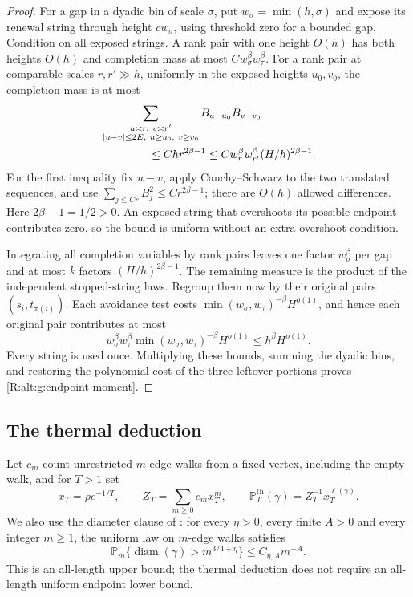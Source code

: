 \begin{proof}
For a gap in a dyadic bin of scale $\sigma$, put
$w_\sigma=\min(h,\sigma)$ and expose its renewal string through height
$c w_\sigma$, using threshold zero for a bounded gap. Condition on
all exposed strings. A rank pair with one height $O(h)$ has both
heights $O(h)$ and completion mass at most
$Cw_\sigma^\beta w_\tau^\beta$. For a rank pair at comparable scales
$r,r'\gg h$, uniformly in the exposed heights $u_0,v_0$, the completion
mass is at most
\begin{align*}
 &\sum_{\substack{u\asymp r,\ v\asymp r'\\
                |u-v|\le2E,\ u\ge u_0,\ v\ge v_0}}
         B_{u-u_0}B_{v-v_0}\\
 &\hspace{15mm}\le Chr^{2\beta-1}
 \le Cw_r^\beta w_{r'}^\beta(H/h)^{2\beta-1}.
\end{align*}
For the first inequality fix $u-v$, apply Cauchy--Schwarz to the two
translated sequences, and use
$\sum_{j\le Cr}B_j^2\le Cr^{2\beta-1}$; there are $O(h)$ allowed
differences. Here $2\beta-1=1/2>0$. An exposed string that overshoots
its possible endpoint contributes zero, so the bound is uniform without
an extra overshoot condition.

Integrating all completion variables by rank pairs leaves one factor
$w_\sigma^\beta$ per gap and at most $k$ factors
$(H/h)^{2\beta-1}$. The remaining measure is the product of the
independent stopped-string laws. Regroup them now by their original
pairs $(s_i,t_{\pi(i)})$. Each avoidance test costs
$\min(w_\sigma,w_\tau)^{-\beta}H^{o(1)}$, and hence each original
pair contributes at most
\[
 w_\sigma^\beta w_\tau^\beta
       \min(w_\sigma,w_\tau)^{-\beta}H^{o(1)}
 \le h^\beta H^{o(1)}.
\]
Every string is used once. Multiplying these bounds, summing the dyadic
bins, and restoring the polynomial cost of the three leftover portions
proves \eqref{R:alt:g:endpoint-moment}.
\end{proof}

\subsection{The thermal deduction}

Let $c_m$ count unrestricted $m$-edge walks from a fixed vertex, including
the empty walk, and for $T>1$ set
\[
 x_T=\rho e^{-1/T},\qquad
 Z_T=\sum_{m\ge0}c_mx_T^m,\qquad
 \mathbb P_T^{\mathrm{th}}(\gamma)=Z_T^{-1}x_T^{\ell(\gamma)}.
\]
We also use the diameter clause of \cite[Theorem~1.1]{Geometry2026}:
for every $\eta>0$, every finite $A>0$ and every integer $m\ge1$,
the uniform law on $m$-edge walks satisfies
\begin{equation}\label{R:alt:g:uniform-upper}
 \mathbb P_m\{\operatorname{diam}(\gamma)>m^{3/4+\eta}\}
       \le C_{\eta,A}m^{-A}.
\end{equation}
This is an all-length upper bound; the thermal deduction does not
require an all-length uniform endpoint lower bound.

